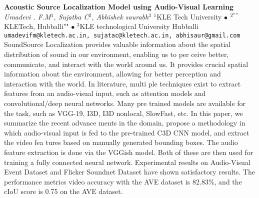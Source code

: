 
    \begin{conf-abstract}[]
        {\textbf{Acoustic Source Localization Model using  Audio-Visual Learning}}
        {\textit{Umadevi . F.M$^{1}$, Sujatha C$^{2}$, Abhishek saurabh$^{3}$}}
        {$^{1}$KLE Tech University $\bullet$ $^{2 ""}$KLETech, Hubballi"" $\bullet$ $^{3}$KLE technological University Hubballi}
        {\texttt{umadevifm@kletech.ac.in, sujatac@kletech.ac.in, abhisaur@gmail.com}}
        {SoundSource Localization provides valuable information about  the spatial distribution of sound in our environment, enabling us to per ceive better, communicate, and interact with the world around us. It  provides crucial spatial information about the environment, allowing for  better perception and interaction with the world. In literature, multi ple techniques exist to extract features from an audio-visual input, such  as attention models and convolutional/deep neural networks. Many pre trained models are available for the task, such as VGG-19, I3D, I3D nonlocal, SlowFast, etc. In this paper, we summarize the recent advance ments in the domain, propose a methodology in which audio-visual input  is fed to the pre-trained C3D CNN model, and extract the video fea tures based on manually generated bounding boxes. The audio feature  extraction is done via the VGGish model. Both of these are then used  for training a fully connected neural network. Experimental results on  Audio-Visual Event Dataset and Flicker Soundnet Dataset have shown  satisfactory results. The performance metrics video accuracy with the  AVE dataset is 82.83\%, and the cIoU score is 0.75 on the AVE dataset.}
    \end{conf-abstract}
        